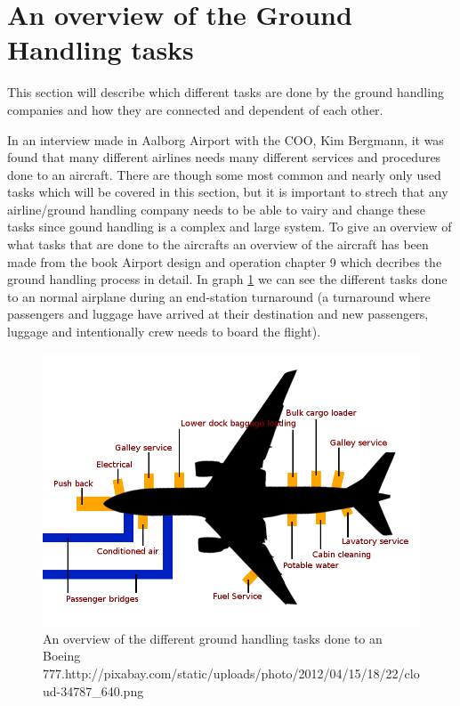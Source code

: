 \section{An overview of the Ground Handling tasks}
This section will describe which different tasks are done by the ground handling companies and how they are connected and dependent of each other.

In an interview made in Aalborg Airport with the COO, Kim Bergmann, it was found that many different airlines needs many different services and procedures done to an aircraft. There are though some most common and nearly only used tasks which will be covered in this section, but it is important to strech that any airline/ground handling company needs to be able to vairy and change these tasks since gound handling is a complex and large system. To give an overview of what tasks that are done to the aircrafts an overview of the aircraft has been made from the book Airport design and operation \cite{Airport design and operation} chapter 9 which decribes the ground handling process in detail. In graph \ref{B-777_Turnaround} we can see the different tasks done to an normal airplane during an end-station turnaround (a turnaround where passengers and luggage have arrived at their destination and new passengers, luggage and intentionally crew needs to board the flight).

\begin{figure}[H]
\centering
\includegraphics[width=\textwidth]{Grafik/B-777_Turnaround}
\caption{An overview of the different ground handling tasks done to an Boeing 777.http://pixabay.com/static/uploads/photo/2012/04/15/18/22/cloud-34787_640.png}
\label{B-777_Turnaround}
\end{figure}


